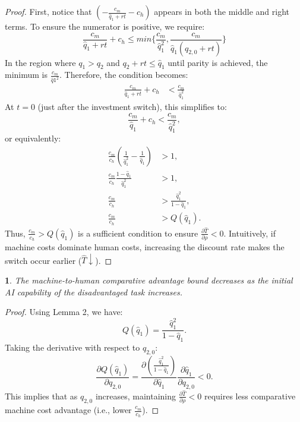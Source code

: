 \documentclass{article}
\theoremstyle{plain}
\theoremstyle{plain}
\newtheorem{cor}{\protect\corollaryname}
\newtheorem{cor}{\protect\corollaryname}[chapter]
\providecommand{\corollaryname}{Corollary}
\begin{document}
\begin{proof}
First, notice that $\left(-\frac{c_{m}}{\hat{q}_{1}+rt}-c_{h}\right)$ appears in both the middle and right terms. 
To ensure the numerator is positive, we require:
\[
\frac{c_{m}}{\hat{q}_{1}+rt}+c_{h}\leq min\{\frac{c_{m}}{\hat{q}_{1}^{2}},\frac{c_{m}}{\hat{q}_{1}(q_{2,0}+rt)}\}
\]
In the region where $q_{1}>q_{2}$ and $q_{2}+rt\leq\hat{q}_{1}$ until parity is achieved, the minimum is $\frac{c_{m}}{\hat{q}{1}^{2}}$.
Therefore, the condition becomes: 
\begin{align*}
\frac{c_{m}}{\hat{q}_{1}+rt}+c_{h} & <\frac{c_{m}}{\hat{q}_{1}^{2}}
\end{align*}
At $t=0$ (just after the investment switch), this simplifies to:
\[
\frac{c_{m}}{\hat{q}_{1}}+c_{h}<\frac{c_{m}}{\hat{q}_{1}^{2}},
\]
or equivalently:
\begin{align*}
\frac{c_{m}}{c_{h}}\left(\frac{1}{\hat{q}_{1}^{2}}-\frac{1}{\hat{q}_{1}}\right) & >1,\\
\frac{c_{m}}{c_{h}}\frac{1-\hat{q}_{1}}{\hat{q}_{1}^{2}} & >1,\\
\frac{c_{m}}{c_{h}} & >\frac{\hat{q}_{1}^{2}}{1-\hat{q}_{1}},\\
\frac{c_{m}}{c_{h}} & >Q(\hat{q}_{1}).
\end{align*}
Thus, $\frac{c_{m}}{c_{h}}>Q(\hat{q}_{1})$ is a sufficient condition to ensure $\frac{\partial\hat{T}}{\partial\rho}<0$. 
Intuitively, if machine costs dominate human costs, increasing the discount rate makes the switch occur earlier ($\hat{T}\downarrow$).
\end{proof}

\begin{cor}
The machine-to-human comparative advantage bound decreases as the initial AI capability of the disadvantaged task increases.
\end{cor}

\begin{proof}
Using Lemma 2, we have:
\[
Q(\hat{q}_{1})=\frac{\hat{q}_{1}^{2}}{1-\hat{q}_{1}}.
\]
Taking the derivative with respect to $q_{2,0}$:
\[
\frac{\partial Q(\hat{q}_{1})}{\partial q_{2,0}}=\frac{\partial\left(\frac{\hat{q}_{1}^{2}}{1-\hat{q}_{1}}\right)}{\partial\hat{q}_{1}}\frac{\partial\hat{q}_{1}}{\partial q_{2,0}}<0.
\]
This implies that as $q_{2,0}$ increases, maintaining $\frac{\partial\hat{T}}{\partial\rho}<0$ requires less comparative machine cost advantage (i.e., lower $\frac{c_{m}}{c_{h}}$).
\end{proof}
\end{document}
